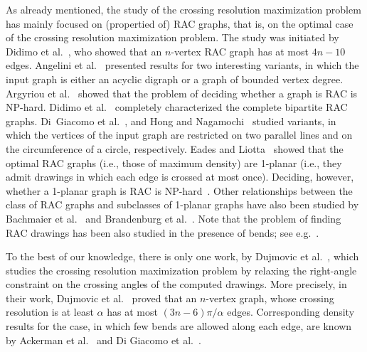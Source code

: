 \documentclass{llncs}
\begin{document}
As already mentioned, the study of the crossing resolution maximization problem has mainly focused on (propertied of) RAC graphs, that is, on the optimal case of the crossing resolution maximization problem. The study was initiated by Didimo et al.~\cite{DBLP:journals/tcs/DidimoEL11}, who showed that an $n$-vertex RAC graph has at most $4n-10$ edges. 
Angelini et al.~\cite{DBLP:journals/jgaa/AngeliniCDFBKS11} presented results for two interesting variants, in which the input graph is either an acyclic digraph or a graph of bounded vertex degree. Argyriou et al.~\cite{DBLP:journals/jgaa/ArgyriouBS12} showed that the problem of deciding whether a graph is RAC is NP-hard. Didimo et al.~\cite{DBLP:journals/ipl/DidimoEL10} completely characterized the complete bipartite RAC graphs. Di~Giacomo et al.~\cite{DBLP:journals/algorithmica/GiacomoDEL14}, and Hong and Nagamochi~\cite{DBLP:conf/wg/HongN15} studied variants, in which the vertices of the input graph are restricted on two parallel lines and on the circumference of a circle, respectively. Eades and Liotta~\cite{DBLP:journals/dam/EadesL13} showed that the optimal RAC graphs (i.e., those of maximum density) are 1-planar (i.e., they admit drawings in which each edge is crossed at most once). Deciding, however, whether a 1-planar graph is RAC is NP-hard~\cite{DBLP:journals/tcs/BekosDLMM17}. Other relationships between the class of RAC graphs and subclasses of 1-planar graphs have also been studied by Bachmaier et al.~\cite{DBLP:journals/dam/BachmaierBHNR17} and Brandenburg et al.~\cite{DBLP:journals/tcs/BrandenburgDEKL16}. Note that the problem of finding RAC drawings has been also studied in the presence of bends; see e.g.~\cite{DBLP:journals/jgaa/AngeliniCDFBKS11,DBLP:journals/comgeo/ArikushiFKMT12,DBLP:journals/tcs/DidimoEL11,DBLP:journals/mst/GiacomoDLM11}. 

To the best of our knowledge, there is only one work, by Dujmovic et al.~\cite{DBLP:journals/cjtcs/DujmovicGMW11}, which studies the crossing resolution maximization problem by relaxing the right-angle constraint on the crossing angles of the computed drawings. More precisely, in their work, Dujmovic et al.~\cite{DBLP:journals/cjtcs/DujmovicGMW11} proved that an $n$-vertex graph, whose crossing resolution is at least $\alpha$ has at most $(3n-6)\pi/\alpha$ edges. Corresponding density results for the case, in which few bends are allowed along each edge, are known by Ackerman et al.~\cite{DBLP:journals/siamdm/AckermanFT12} and Di Giacomo et al.~\cite{DBLP:journals/mst/GiacomoDLM11}.  
\end{document}
